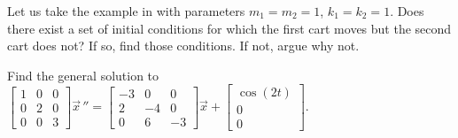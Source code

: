 \documentclass[12pt]{book}
\begin{document}
\begin{exercise}
Let us take the example in  with
parameters
$m_1 = m_2 = 1$, $k_1 = k_2 = 1$.  Does there exist a set of initial
conditions for which the first cart moves but the second cart does not?
If so, find those conditions.  If not, argue why not.
\end{exercise}

\setcounter{exercise}{100}

\begin{exercise}
Find the general solution to
$\left[ \begin{smallmatrix}
1 & 0 & 0\\
0 & 2 & 0\\
0 & 0 & 3
\end{smallmatrix}\right]
\vec{x}\,''
=
\left[ \begin{smallmatrix}
-3 & 0 & 0 \\
2 & -4 & 0 \\
0 & 6 & -3
\end{smallmatrix}\right]
\vec{x}
+ 
\left[ \begin{smallmatrix}
\cos(2t) \\ 0 \\ 0
\end{smallmatrix}\right]$.
\end{exercise}
\end{document}
